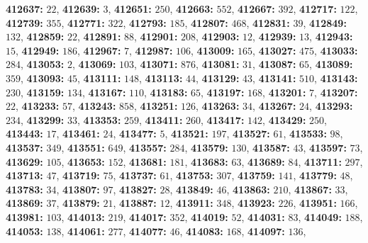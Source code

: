 \textsf{\bfseries 412637:} $22$, \textsf{\bfseries 412639:} $3$, \textsf{\bfseries 412651:} $250$, \textsf{\bfseries 412663:} $552$, \textsf{\bfseries 412667:} $392$, \textsf{\bfseries 412717:} $122$, \textsf{\bfseries 412739:} $355$, \textsf{\bfseries 412771:} $322$, \textsf{\bfseries 412793:} $185$, \textsf{\bfseries 412807:} $468$, \textsf{\bfseries 412831:} $39$, \textsf{\bfseries 412849:} $132$, \textsf{\bfseries 412859:} $22$, \textsf{\bfseries 412891:} $88$, \textsf{\bfseries 412901:} $208$, \textsf{\bfseries 412903:} $12$, \textsf{\bfseries 412939:} $13$, \textsf{\bfseries 412943:} $15$, \textsf{\bfseries 412949:} $186$, \textsf{\bfseries 412967:} $7$, \textsf{\bfseries 412987:} $106$, \textsf{\bfseries 413009:} $165$, \textsf{\bfseries 413027:} $475$, \textsf{\bfseries 413033:} $284$, \textsf{\bfseries 413053:} $2$, \textsf{\bfseries 413069:} $103$, \textsf{\bfseries 413071:} $876$, \textsf{\bfseries 413081:} $31$, \textsf{\bfseries 413087:} $65$, \textsf{\bfseries 413089:} $359$, \textsf{\bfseries 413093:} $45$, \textsf{\bfseries 413111:} $148$, \textsf{\bfseries 413113:} $44$, \textsf{\bfseries 413129:} $43$, \textsf{\bfseries 413141:} $510$, \textsf{\bfseries 413143:} $230$, \textsf{\bfseries 413159:} $134$, \textsf{\bfseries 413167:} $110$, \textsf{\bfseries 413183:} $65$, \textsf{\bfseries 413197:} $168$, \textsf{\bfseries 413201:} $7$, \textsf{\bfseries 413207:} $22$, \textsf{\bfseries 413233:} $57$, \textsf{\bfseries 413243:} $858$, \textsf{\bfseries 413251:} $126$, \textsf{\bfseries 413263:} $34$, \textsf{\bfseries 413267:} $24$, \textsf{\bfseries 413293:} $234$, \textsf{\bfseries 413299:} $33$, \textsf{\bfseries 413353:} $259$, \textsf{\bfseries 413411:} $260$, \textsf{\bfseries 413417:} $142$, \textsf{\bfseries 413429:} $250$, \textsf{\bfseries 413443:} $17$, \textsf{\bfseries 413461:} $24$, \textsf{\bfseries 413477:} $5$, \textsf{\bfseries 413521:} $197$, \textsf{\bfseries 413527:} $61$, \textsf{\bfseries 413533:} $98$, \textsf{\bfseries 413537:} $349$, \textsf{\bfseries 413551:} $649$, \textsf{\bfseries 413557:} $284$, \textsf{\bfseries 413579:} $130$, \textsf{\bfseries 413587:} $43$, \textsf{\bfseries 413597:} $73$, \textsf{\bfseries 413629:} $105$, \textsf{\bfseries 413653:} $152$, \textsf{\bfseries 413681:} $181$, \textsf{\bfseries 413683:} $63$, \textsf{\bfseries 413689:} $84$, \textsf{\bfseries 413711:} $297$, \textsf{\bfseries 413713:} $47$, \textsf{\bfseries 413719:} $75$, \textsf{\bfseries 413737:} $61$, \textsf{\bfseries 413753:} $307$, \textsf{\bfseries 413759:} $141$, \textsf{\bfseries 413779:} $48$, \textsf{\bfseries 413783:} $34$, \textsf{\bfseries 413807:} $97$, \textsf{\bfseries 413827:} $28$, \textsf{\bfseries 413849:} $46$, \textsf{\bfseries 413863:} $210$, \textsf{\bfseries 413867:} $33$, \textsf{\bfseries 413869:} $37$, \textsf{\bfseries 413879:} $21$, \textsf{\bfseries 413887:} $12$, \textsf{\bfseries 413911:} $348$, \textsf{\bfseries 413923:} $226$, \textsf{\bfseries 413951:} $166$, \textsf{\bfseries 413981:} $103$, \textsf{\bfseries 414013:} $219$, \textsf{\bfseries 414017:} $352$, \textsf{\bfseries 414019:} $52$, \textsf{\bfseries 414031:} $83$, \textsf{\bfseries 414049:} $188$, \textsf{\bfseries 414053:} $138$, \textsf{\bfseries 414061:} $277$, \textsf{\bfseries 414077:} $46$, \textsf{\bfseries 414083:} $168$, \textsf{\bfseries 414097:} $136$, 

